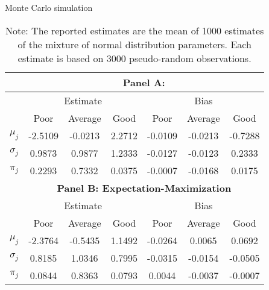 \begin{table}[t]
\centering
\small
\captionsetup{labelsep=colon, font=footnotesize, justification=centerfirst}
\caption{Monte Carlo simulation}
\begin{tabular}{*{7}{c}}
    \toprule
    & \multicolumn{6}{c}{\textbf{Panel A: \citet{Barras2010}}} \\
    \midrule
    & \multicolumn{3}{c}{Estimate} & \multicolumn{3}{c}{Bias} \\
    \cmidrule(l{2pt}r{2pt}){2-4} \cmidrule(l{2pt}r{2pt}){5-7}
    & Poor & Average & Good & Poor & Average & Good \\
    \midrule
    $\mu_j$ & -2.5109 & -0.0213 & 2.2712 & -0.0109 & -0.0213 & -0.7288 \\
    $\sigma_j$ & 0.9873 & 0.9877 & 1.2333 & -0.0127 & -0.0123 & 0.2333 \\
    $\pi_j$ & 0.2293 & 0.7332 & 0.0375 & -0.0007 & -0.0168 & 0.0175 \\
    \midrule
    & \multicolumn{6}{c}{\textbf{Panel B: Expectation-Maximization}} \\
    \midrule
    & \multicolumn{3}{c}{Estimate} & \multicolumn{3}{c}{Bias} \\
    \cmidrule(l{2pt}r{2pt}){2-4} \cmidrule(l{2pt}r{2pt}){5-7}
    & Poor & Average & Good & Poor & Average & Good \\
    \midrule
    $\mu_j$ & -2.3764 & -0.5435 & 1.1492 & -0.0264 & 0.0065 & 0.0692 \\
    $\sigma_j$ & 0.8185 & 1.0346 & 0.7995 & -0.0315 & -0.0154 & -0.0505 \\
    $\pi_j$ & 0.0844 & 0.8363 & 0.0793 & 0.0044 & -0.0037 & -0.0007 \\
    \bottomrule
    \end{tabular}
\captionsetup{position=below, font=footnotesize, justification=justified, width=0.57\linewidth}
\caption*{Note: The reported estimates are the mean of 1000 estimates of the mixture of normal distribution parameters.  Each estimate is based on 3000 pseudo-random observations.}
\label{tab:simulation}
\end{table}

